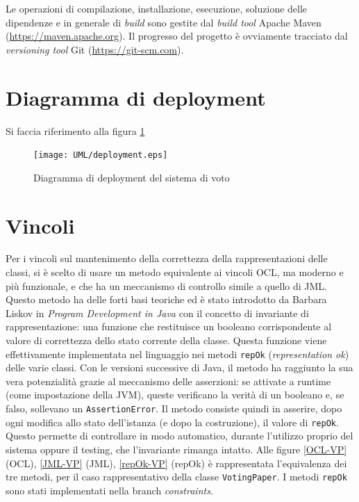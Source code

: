 Le operazioni di compilazione, installazione, esecuzione, soluzione delle dipendenze e in generale di \emph{build} sono gestite dal \emph{build tool} Apache Maven (\url{https://maven.apache.org}). Il progresso del progetto è ovviamente tracciato dal \emph{versioning tool} Git (\url{https://git-scm.com}).




\section{Diagramma di deployment}\label{deployment}
Si faccia riferimento alla figura \ref{fig:deployment}
\begin{figure}[ht]
	\centering
	\texttt{[image: UML/deployment.eps]}
	\caption{Diagramma di deployment del sistema di voto}
	\label{fig:deployment}
\end{figure}




\section{Vincoli}\label{vincoli}
Per i vincoli sul mantenimento della correttezza della rappresentazioni delle classi, si è scelto di usare un metodo equivalente ai vincoli OCL, ma moderno e più funzionale, e che ha un meccanismo di controllo simile a quello di JML. Questo metodo ha delle forti basi teoriche ed è stato introdotto da Barbara Liskov in \emph{Program Development in Java} con il concetto di invariante di rappresentazione: una funzione che restituisce un booleano corrispondente al valore di correttezza dello stato corrente della classe. Questa funzione viene effettivamente implementata nel linguaggio nei metodi \verb!repOk! (\emph{representation ok}) delle varie classi. Con le versioni successive di Java, il metodo ha raggiunto la sua vera potenzialità grazie al meccanismo delle asserzioni: se attivate a runtime (come impostazione della JVM), queste verificano la verità di un booleano e, se falso, sollevano un \verb!AssertionError!. Il metodo consiste quindi in asserire, dopo ogni modifica allo stato dell'istanza (e dopo la costruzione), il valore di \verb!repOk!. Questo permette di controllare in modo automatico, durante l'utilizzo proprio del sistema oppure il testing, che l'invariante rimanga intatto. Alle figure \ref{OCL-VP} (OCL), \ref{JML-VP} (JML), \ref{repOk-VP} (repOk) è rappresentata l'equivalenza dei tre metodi, per il caso rappresentativo della classe \verb!VotingPaper!. I metodi \verb!repOk! sono stati implementati nella branch \emph{constraints}.


